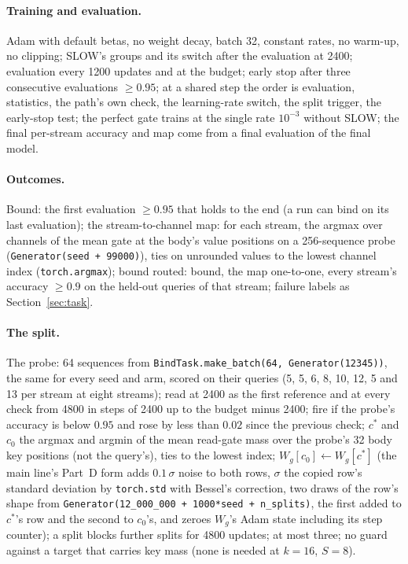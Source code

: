 \documentclass[11pt]{article}
\begin{document}
\paragraph{Training and evaluation.} Adam with default betas, no weight decay, batch 32, constant rates, no warm-up, no clipping; SLOW's groups and its switch after the evaluation at 2400; evaluation every 1200 updates and at the budget; early stop after three consecutive evaluations $\geq 0.95$; at a shared step the order is evaluation, statistics, the path's own check, the learning-rate switch, the split trigger, the early-stop test; the perfect gate trains at the single rate $10^{-3}$ without SLOW; the final per-stream accuracy and map come from a final evaluation of the final model.

\paragraph{Outcomes.} Bound: the first evaluation $\geq 0.95$ that holds to the end (a run can bind on its last evaluation); the stream-to-channel map: for each stream, the argmax over channels of the mean gate at the body's value positions on a 256-sequence probe (\texttt{Generator(seed + 99000)}), ties on unrounded values to the lowest channel index (\texttt{torch.argmax}); bound routed: bound, the map one-to-one, every stream's accuracy $\geq 0.9$ on the held-out queries of that stream; failure labels as Section~\ref{sec:task}.

\paragraph{The split.} The probe: 64 sequences from \texttt{BindTask.make\_batch(64, Generator(12345))}, the same for every seed and arm, scored on their queries (5, 5, 6, 8, 10, 12, 5 and 13 per stream at eight streams); read at 2400 as the first reference and at every check from 4800 in steps of 2400 up to the budget minus 2400; fire if the probe's accuracy is below $0.95$ and rose by less than $0.02$ since the previous check; $c^*$ and $c_0$ the argmax and argmin of the mean read-gate mass over the probe's 32 body key positions (not the query's), ties to the lowest index; $W_g[c_0] \gets W_g[c^*]$ (the main line's Part~D form adds $0.1\,\sigma$ noise to both rows, $\sigma$ the copied row's standard deviation by \texttt{torch.std} with Bessel's correction, two draws of the row's shape from \texttt{Generator(12\_000\_000 + 1000*seed + n\_splits)}, the first added to $c^*$'s row and the second to $c_0$'s, and zeroes $W_g$'s Adam state including its step counter); a split blocks further splits for 4800 updates; at most three; no guard against a target that carries key mass (none is needed at $k = 16$, $S = 8$).
\end{document}
